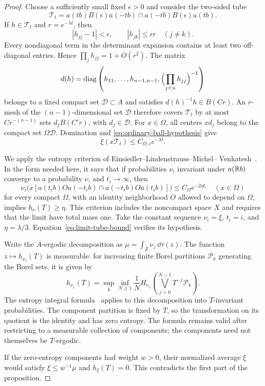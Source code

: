 \begin{proof}
Choose a sufficiently small fixed $\epsilon>0$ and consider the two-sided
tube
\[
 \mathcal T_t=a(tb)B(\epsilon)a(-tb)
               \cap a(-tb)B(\epsilon)a(tb).
\]
If $h\in\mathcal T_t$ and $r=e^{-\lambda t}$, then
\[
 |h_{jj}-1|<\epsilon,\qquad |h_{jk}|\le\epsilon r\quad(j\ne k).
\]
Every nondiagonal term in the determinant expansion contains at least two
off-diagonal entries. Hence $\prod_jh_{jj}=1+O(r^2)$. The matrix
\[
 d(h)=\operatorname{diag}\left(h_{11},\ldots,h_{n-1,n-1},
                       \Bigl(\prod_{j<n}h_{jj}\Bigr)^{-1}\right)
\]
belongs to a fixed compact set $\mathcal D\subset A$ and satisfies
$d(h)^{-1}h\in B(Cr)$. An $r$-mesh of the $(n-1)$-dimensional set
$\mathcal D$ therefore covers $\mathcal T_t$ by at most
$Cr^{-(n-1)}$ sets $d_jB(C'r)$, with $d_j\in\mathcal D$.
For $x\in\Omega$, all centers $xd_j$ belong to the compact set
$\Omega\mathcal D$. Domination and
\eqref{eq:ordinary-ball-hypothesis} give
\begin{equation}\label{eq:limit-tube-bound}
 \xi(x\mathcal T_t)\le C_{\Omega,c}e^{-\lambda t}.
\end{equation}

We apply the entropy criterion of Einsiedler--Lindenstrauss--Michel--
Venkatesh~\cite[Corollary~3.3]{ELMV2009}. In the form needed here, it says
that if probabilities $\nu_i$ invariant under $a(\mathbb R b)$ converge to a probability
$\nu$, and $t_i\to\infty$, then
\[
 \nu_i\bigl(x[a(t_ib)Oa(-t_ib)\cap a(-t_ib)Oa(t_ib)]\bigr)
       \le C_\Omega e^{-2\eta t_i}\quad(x\in\Omega)
\]
for every compact $\Omega$, with an identity neighborhood $O$ allowed to
depend on $\Omega$, implies $h_\nu(T)\ge\eta$.
This criterion includes the noncompact space $X$ and requires that the
limit have total mass one. Take the constant sequence $\nu_i=\xi$,
$t_i=i$, and $\eta=\lambda/3$. Equation~\eqref{eq:limit-tube-bound}
verifies its hypothesis.

Write the $A$-ergodic decomposition as
$\mu=\int_Z\nu_z\,\dd\tau(z)$. The function
$z\mapsto h_{\nu_z}(T)$ is measurable: for increasing finite Borel
partitions $\mathcal P_k$ generating the Borel sets, it is given by
\[
 h_{\nu_z}(T)=\sup_k\inf_{N\ge1}\frac1N
 H_{\nu_z}\left(\bigvee_{j=0}^{N-1}T^{-j}\mathcal P_k\right).
\]
The entropy integral formula~\cite[Theorem~9.8]{Rokhlin1967} applies to
this decomposition into $T$-invariant probabilities. The component partition is
fixed by $T$, so the transformation on its quotient is the identity and
has zero entropy. The formula remains valid after restricting to a
measurable collection of components; the components need not themselves
be $T$-ergodic.

If the zero-entropy components had weight $w>0$, their normalized average
$\xi$ would satisfy $\xi\le w^{-1}\mu$ and $h_\xi(T)=0$. This
contradicts the first part of the proposition.
\end{proof}

